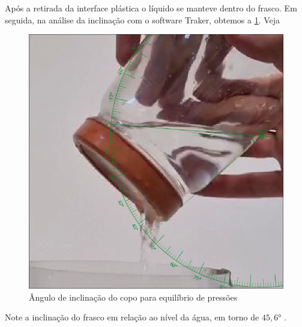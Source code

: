 Após a retirada da interface plástica o líquido se manteve dentro do frasco. Em
seguida, na análise da inclinação com o software Traker, obtemos a \cref{copo.png}. Veja
\begin{figure}[H]
    \centering
    \includegraphics[width=.35\linewidth]{fig/copo.png}
    \caption{Ângulo de inclinação do copo para equilíbrio de pressões}
    \label{copo.png}
\end{figure}

Note a inclinação do frasco em relação ao nível da água, em torno de \( 45,6 \)°
.

